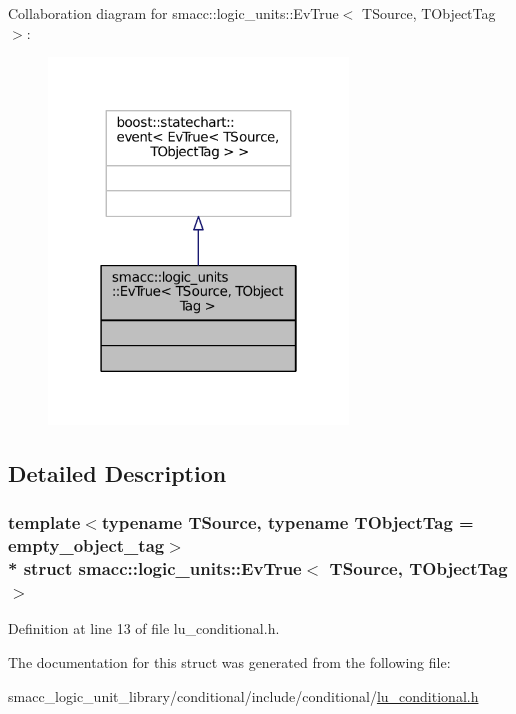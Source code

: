 Collaboration diagram for smacc\+:\+:logic\+\_\+units\+:\+:Ev\+True$<$ T\+Source, T\+Object\+Tag $>$\+:
\nopagebreak
\begin{figure}[H]
\begin{center}
\leavevmode
\includegraphics[width=226pt]{structsmacc_1_1logic__units_1_1EvTrue__coll__graph}
\end{center}
\end{figure}


\subsection{Detailed Description}
\subsubsection*{template$<$typename T\+Source, typename T\+Object\+Tag = empty\+\_\+object\+\_\+tag$>$\\*
struct smacc\+::logic\+\_\+units\+::\+Ev\+True$<$ T\+Source, T\+Object\+Tag $>$}



Definition at line 13 of file lu\+\_\+conditional.\+h.



The documentation for this struct was generated from the following file\+:\begin{DoxyCompactItemize}
\item 
smacc\+\_\+logic\+\_\+unit\+\_\+library/conditional/include/conditional/\hyperlink{lu__conditional_8h}{lu\+\_\+conditional.\+h}\end{DoxyCompactItemize}
